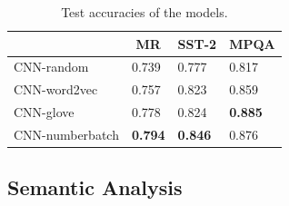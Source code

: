 \documentclass{article}
\begin{document}
\begin{table}
    \caption{Test accuracies of the models.}
    \label{test-table}
    \centering
    \begin{tabular}{llll}
        \toprule
        & \multicolumn{1}{c}{MR} & \multicolumn{1}{c}{SST-2} & \multicolumn{1}{c}{MPQA} \\
        \midrule
        CNN-random & 0.739 & 0.777 & 0.817 \\
        CNN-word2vec & 0.757 & 0.823 & 0.859 \\
        CNN-glove & 0.778 & 0.824 & \textbf{0.885} \\
        CNN-numberbatch & \textbf{0.794} & \textbf{0.846} & 0.876 \\
        \bottomrule
    \end{tabular}
\end{table}

\subsection{Semantic Analysis}
\end{document}
